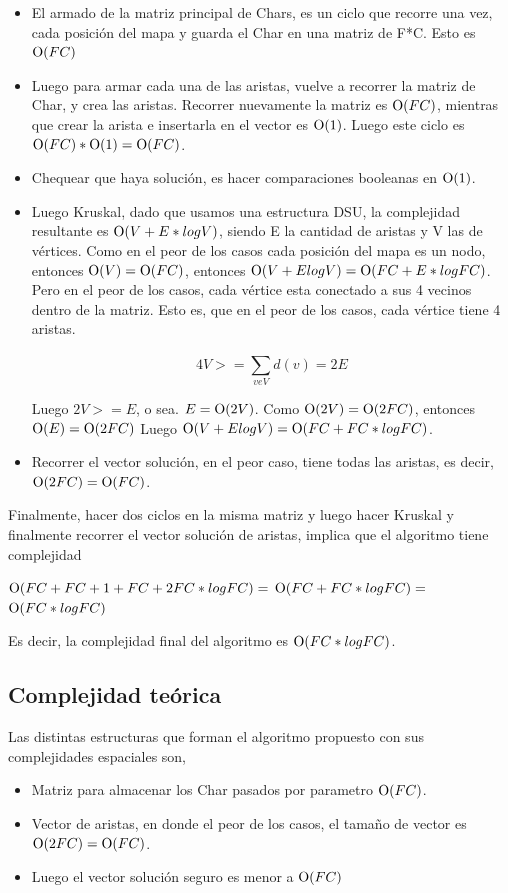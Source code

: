 	\begin{itemize}
	 \item El armado de la matriz principal de Chars, es un ciclo que recorre una vez, cada posición del mapa y guarda el Char en una matriz de F*C. Esto es $\operatorname{O}(FC)$
	 \item Luego para armar cada una de las aristas, vuelve a recorrer la matriz de Char, y crea las aristas. Recorrer nuevamente la matriz es $\operatorname{O}(FC)$, mientras que crear la arista e insertarla en el vector es $\operatorname{O}(1)$. Luego este ciclo es $\operatorname{O}(FC) * \operatorname{O}(1) = \operatorname{O}(FC)$.
	 \item Chequear que haya solución, es hacer comparaciones booleanas en $\operatorname{O}(1)$.
	 \item Luego Kruskal, dado que usamos una estructura DSU, la complejidad resultante es $\operatorname{O}(V + E*log V )$, siendo E la cantidad de aristas y V las de vértices. Como en el peor de los casos cada posición del mapa es un nodo, entonces $\operatorname{O}(V) = \operatorname{O}(FC)$, entonces $\operatorname{O}(V + E log V ) = \operatorname{O}(FC + E*log FC)$. Pero en el peor de los casos, cada vértice esta conectado a sus 4 vecinos dentro de la matriz. Esto es, que en el peor de los casos, cada vértice tiene 4 aristas.

	 	\[
		4V >= \sum_{veV}^{}d(v) = 2E
		\]

	  Luego $2V >= E$, o sea. $E = \operatorname{O}(2V)$. Como $\operatorname{O}(2V) = \operatorname{O}(2FC)$, entonces
	  $\operatorname{O}(E) = \operatorname{O}(2FC)$
	  Luego $\operatorname{O}(V + E log V ) = \operatorname{O}(FC + FC*log FC)$.
	 \item Recorrer el vector solución, en el peor caso, tiene todas las aristas, es decir, $\operatorname{O}(2FC) = \operatorname{O}(FC)$.

	\end{itemize}

	Finalmente, hacer dos ciclos en la misma matriz y luego hacer Kruskal y finalmente recorrer el vector solución de aristas, implica que el algoritmo tiene complejidad\par

	$\operatorname{O}(FC + FC + 1 + FC + 2FC*log FC) =$
	$\operatorname{O}(FC + FC*log FC) =$
	$\operatorname{O}(FC*log FC)$

	Es decir, la complejidad final del algoritmo es $\operatorname{O}(FC*log FC)$.

	\subsection{Complejidad teórica}
	Las distintas estructuras que forman el algoritmo propuesto con sus complejidades espaciales son,
	\begin{itemize}
		\item Matriz para almacenar los Char pasados por parametro $\operatorname{O}(FC)$.
		\item Vector de aristas, en donde el peor de los casos, el tamaño de vector es $\operatorname{O}(2FC) = \operatorname{O}(FC)$.
		\item Luego el vector solución seguro es menor a $\operatorname{O}(FC)$
	\end{itemize}


